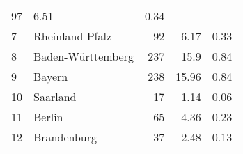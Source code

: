 \begin{longtable}{lXrrr}
       \num{97} &
       \num[round-mode=places,round-precision=2]{6,51} &
         \num[round-mode=places,round-precision=2]{0,34} \\

     7 &
     \multicolumn{1}{X}{ Rheinland-Pfalz   } &


       \num{92} &
       \num[round-mode=places,round-precision=2]{6,17} &
         \num[round-mode=places,round-precision=2]{0,33} \\

     8 &
     \multicolumn{1}{X}{ Baden-Württemberg   } &


       \num{237} &
       \num[round-mode=places,round-precision=2]{15,9} &
         \num[round-mode=places,round-precision=2]{0,84} \\

     9 &
     \multicolumn{1}{X}{ Bayern   } &


       \num{238} &
       \num[round-mode=places,round-precision=2]{15,96} &
         \num[round-mode=places,round-precision=2]{0,84} \\

     10 &
     \multicolumn{1}{X}{ Saarland   } &


       \num{17} &
       \num[round-mode=places,round-precision=2]{1,14} &
         \num[round-mode=places,round-precision=2]{0,06} \\

     11 &
     \multicolumn{1}{X}{ Berlin   } &


       \num{65} &
       \num[round-mode=places,round-precision=2]{4,36} &
         \num[round-mode=places,round-precision=2]{0,23} \\

     12 &
     \multicolumn{1}{X}{ Brandenburg   } &


       \num{37} &
       \num[round-mode=places,round-precision=2]{2,48} &
         \num[round-mode=places,round-precision=2]{0,13} \\


\end{longtable}
